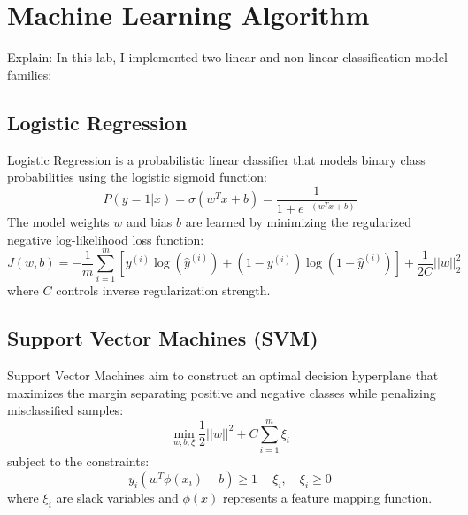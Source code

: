 \documentclass[12pt,a4paper]{article}
\begin{document}
\section{Machine Learning Algorithm}

Explain:
In this lab, I implemented two linear and non-linear classification model families:

\subsection{Logistic Regression}
Logistic Regression is a probabilistic linear classifier that models binary class probabilities using the logistic sigmoid function:
\begin{equation}
P(y=1|x) = \sigma(w^T x + b) = \frac{1}{1 + e^{-(w^T x + b)}}
\end{equation}
The model weights $w$ and bias $b$ are learned by minimizing the regularized negative log-likelihood loss function:
\begin{equation}
J(w, b) = -\frac{1}{m} \sum_{i=1}^{m} \left[ y^{(i)} \log(\hat{y}^{(i)}) + (1 - y^{(i)}) \log(1 - \hat{y}^{(i)}) \right] + \frac{1}{2C} ||w||_2^2
\end{equation}
where $C$ controls inverse regularization strength.

\subsection{Support Vector Machines (SVM)}
Support Vector Machines aim to construct an optimal decision hyperplane that maximizes the margin separating positive and negative classes while penalizing misclassified samples:
\begin{equation}
\min_{w, b, \xi} \frac{1}{2} ||w||^2 + C \sum_{i=1}^{m} \xi_i
\end{equation}
subject to the constraints:
\begin{equation}
y_i (w^T \phi(x_i) + b) \ge 1 - \xi_i, \quad \xi_i \ge 0
\end{equation}
where $\xi_i$ are slack variables and $\phi(x)$ represents a feature mapping function.
\end{document}

